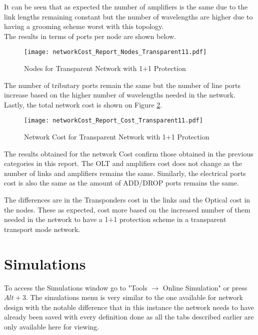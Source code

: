 		It can be seen that as expected the number of amplifiers is the same due to the link lengths remaining constant but the number of wavelengths are higher due to having a grooming scheme worst with this topology.\\
		\newpage
		The results in terms of ports per node are shown below.
		
		\begin{figure}[!h]
			\centering
			\texttt{[image: networkCost\_Report\_Nodes\_Transparent11.pdf]}
			\caption{Nodes for Transparent Network with 1+1 Protection}
			\label{networkCost_Report_Nodes_Transparent11}						
		\end{figure}
		
		 The number of tributary ports remain the same but the number of line ports increase based on the higher number of wavelengths needed in the network.\\
		
		Lastly, the total network cost is shown on Figure \ref{networkCost_Report_Cost_Transparent11}.\\
		
		
		\begin{figure}[!h]
			\centering
			\texttt{[image: networkCost\_Report\_Cost\_Transparent11.pdf]}	
			\caption{Network Cost for Transparent Network with 1+1 Protection}
			\label{networkCost_Report_Cost_Transparent11}								
		\end{figure}		
		
		The results obtained for the network Cost confirm those obtained in the previous categories in this report. The OLT and amplifiers cost does not change as the number of links and amplifiers remains the same. Similarly, the electrical ports cost is also the same as the amount of ADD/DROP ports remains the same.
		
		The differences are in the Transponders cost in the links and the Optical cost in the nodes. These as expected, cost more based on the increased number of them needed in the network to have a 1+1 protection scheme in a transparent transport mode network.
		
	
	\newpage
	
	
	\section{Simulations}
	To access the Simulations window go to  "Tools $\rightarrow$ Online Simulation" or press $Alt + 3$. The simulations menu is very similar to the one available for network design with the notable difference that in this instance the network needs to have already been saved with every definition done as all the tabs described earlier are only available here for viewing.
	
